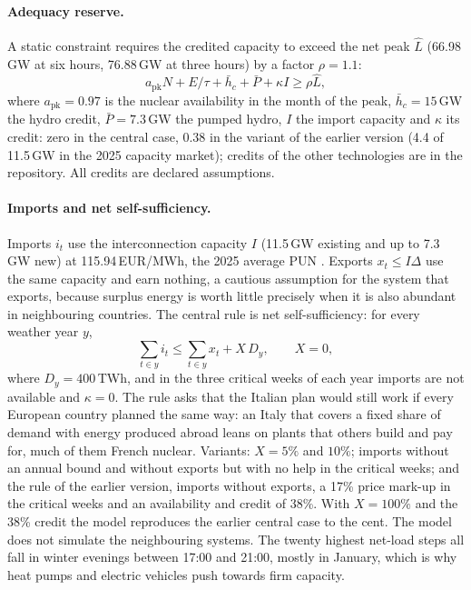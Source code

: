 \paragraph{Adequacy reserve.} A static constraint requires the credited capacity to exceed the net peak $\hat L$ (66.98\,GW at six hours, 76.88\,GW at three hours) by a factor $\rho=1.1$:
\begin{equation}
a_{\mathrm{pk}} N + E/\tau + \bar h_c + \bar P + \kappa I \ge \rho \hat L ,
\end{equation}
where $a_{\mathrm{pk}}=0.97$ is the nuclear availability in the month of the peak, $\bar h_c=15$\,GW the hydro credit, $\bar P=7.3$\,GW the pumped hydro, $I$ the import capacity and $\kappa$ its credit: zero in the central case, 0.38 in the variant of the earlier version (4.4 of 11.5\,GW in the 2025 capacity market); credits of the other technologies are in the repository. All credits are declared assumptions.

\paragraph{Imports and net self-sufficiency.} Imports $i_t$ use the interconnection capacity $I$ (11.5\,GW existing and up to 7.3\,GW new) at 115.94\,EUR/MWh, the 2025 average PUN \citep{GME2025}. Exports $x_t\le I\Delta$ use the same capacity and earn nothing, a cautious assumption for the system that exports, because surplus energy is worth little precisely when it is also abundant in neighbouring countries. The central rule is net self-sufficiency: for every weather year $y$,
\begin{equation}
\sum_{t\in y} i_t \le \sum_{t\in y} x_t + X\,D_y ,\qquad X=0 ,
\end{equation}
where $D_y=400$\,TWh, and in the three critical weeks of each year imports are not available and $\kappa=0$. The rule asks that the Italian plan would still work if every European country planned the same way: an Italy that covers a fixed share of demand with energy produced abroad leans on plants that others build and pay for, much of them French nuclear. Variants: $X=5\%$ and $10\%$; imports without an annual bound and without exports but with no help in the critical weeks; and the rule of the earlier version, imports without exports, a 17\% price mark-up in the critical weeks and an availability and credit of 38\%. With $X=100\%$ and the 38\% credit the model reproduces the earlier central case to the cent. The model does not simulate the neighbouring systems. The twenty highest net-load steps all fall in winter evenings between 17:00 and 21:00, mostly in January, which is why heat pumps and electric vehicles push towards firm capacity.


